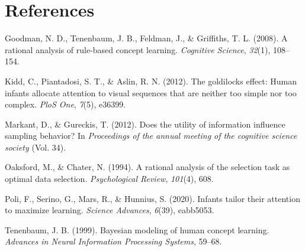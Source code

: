 \documentclass[10pt, letterpaper]{article}
\newenvironment{CSLReferences}%
  {}%
  {\par}
\begin{document}
\hypertarget{references-1}{%
\section{References}\label{references-1}}

\setlength{\parindent}{-0.1in} 
\setlength{\leftskip}{0.125in}

\noindent

\hypertarget{refs}{}
\begin{CSLReferences}{1}{0}
\leavevmode{}%
Goodman, N. D., Tenenbaum, J. B., Feldman, J., \& Griffiths, T. L.
(2008). A rational analysis of rule-based concept learning.
\emph{Cognitive Science}, \emph{32}(1), 108--154.

\leavevmode{}%
Kidd, C., Piantadosi, S. T., \& Aslin, R. N. (2012). The goldilocks
effect: Human infants allocate attention to visual sequences that are
neither too simple nor too complex. \emph{PloS One}, \emph{7}(5),
e36399.

\leavevmode{}%
Markant, D., \& Gureckis, T. (2012). Does the utility of information
influence sampling behavior? In \emph{Proceedings of the annual meeting
of the cognitive science society} (Vol. 34).

\leavevmode{}%
Oaksford, M., \& Chater, N. (1994). A rational analysis of the selection
task as optimal data selection. \emph{Psychological Review},
\emph{101}(4), 608.

\leavevmode{}%
Poli, F., Serino, G., Mars, R., \& Hunnius, S. (2020). Infants tailor
their attention to maximize learning. \emph{Science Advances},
\emph{6}(39), eabb5053.

\leavevmode{}%
Tenenbaum, J. B. (1999). Bayesian modeling of human concept learning.
\emph{Advances in Neural Information Processing Systems}, 59--68.

\end{CSLReferences}


\end{document}
